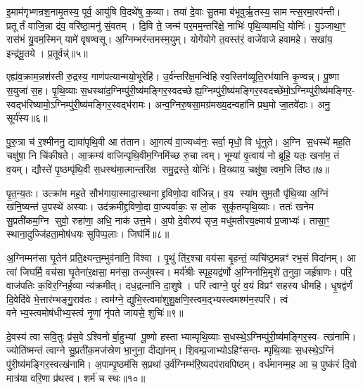 {\anuvakamend[{इद्य॒ज्ञं प्र सु॑व॒ नारि॒रानु॑ष्टुभेन त्वा॒ छन्द॑सा॒ त्रीणि॑ च॥१॥}]}

इ॒माम॑गृभ्णन्रश॒नामृ॒तस्य॒ पूर्व॒ आयु॑षि वि॒दथे॑षु क॒व्या। तया॑ दे॒वाः सु॒तमा ब॑भूवुर्\mbox{}ऋ॒तस्य॒ सामन्त्स॒रमा॒रप॑न्ती। प्रतूर्तं वाजि॒न्ना द्र॑व॒ वरि॑ष्ठा॒मनु॑ सं॒वतम्। दि॒वि ते॒ जन्म॑ पर॒मम॒न्तरि॑क्षे॒ नाभिः॑ पृथि॒व्यामधि॒ योनिः॑। यु॒ञ्जाथा॒ꣳ॒ रास॑भं यु॒वम॒स्मिन् यामे॑ वृषण्वसू। अ॒ग्निम्भर॑न्तमस्म॒युम्। योगे॑योगे त॒वस्त॑रं॒ वाजे॑वाजे हवामहे। सखा॑य॒ इन्द्र॑मू॒तये। प्र॒तूर्वन्न्॑॥५॥

एह्य॑व॒क्राम॒न्नश॑स्ती रु॒द्रस्य॒ गाण॑पत्यान्मयो॒भूरेहि॑। उ॒र्व॑न्तरि॑क्ष॒मन्वि॑हि स्व॒स्तिग॑व्यूति॒रभ॑यानि कृ॒ण्वन्न्। पू॒ष्णा स॒युजा॑ स॒ह। पृ॒थि॒व्याः स॒धस्था॑द॒ग्निम्पु॑री॒ष्य॑मङ्गिर॒स्वदच्छेह्य॒ग्निम्पु॑री॒ष्य॑मङ्गिर॒स्वदच्छे॑मो॒ऽग्निम्पु॑री॒ष्य॑मङ्गिर॒- स्वद्भ॑रिष्यामो॒ऽग्निम्पु॑री॒ष्य॑मङ्गिर॒स्वद्भ॑रामः। अन्व॒ग्निरु॒षसा॒मग्र॑मख्य॒दन्वहा॑नि प्रथ॒मो जा॒तवे॑दाः। अनु॒ सूर्य॑स्य॥६॥

पु॒रु॒त्रा च॑ र॒श्मीननु॒ द्यावा॑पृथि॒वी आ त॑तान। आ॒गत्य॑ वा॒ज्यध्व॑नः॒ सर्वा॒ मृधो॒ वि धू॑नुते। अ॒ग्नि स॒धस्थे॑ मह॒ति चक्षु॑षा॒ नि चि॑कीषते। आ॒क्रम्य॑ वाजिन्पृथि॒वीम॒ग्निमि॑च्छ रु॒चा त्वम्। भूम्या॑ वृ॒त्वाय॑ नो ब्रूहि॒ यतः॒ खना॑म॒ तं व॒यम्। द्यौस्ते॑ पृ॒ष्ठम्पृ॑थि॒वी स॒धस्थ॑मा॒त्मान्तरि॑क्ष समु॒द्रस्ते॒ योनिः॑। वि॒ख्याय॒ चक्षु॑षा॒ त्वम॒भि ति॑ष्ठ॥७॥

पृ॒त॒न्य॒तः। उत्क्रा॑म मह॒ते सौभ॑गाया॒स्मादा॒स्थानाद्द्रविणो॒दा वा॑जिन्न्। व॒य स्या॑म सुम॒तौ पृ॑थि॒व्या अ॒ग्निं ख॑नि॒ष्यन्त॑ उ॒पस्थे॑ अस्याः। उद॑क्रमीद्द्रविणो॒दा वा॒ज्यर्वाकः॒ स लो॒क सुकृ॑तम्पृथि॒व्याः। ततः॑ खनेम सु॒प्रती॑कम॒ग्नि सुवो॒ रुहा॑णा॒ अधि॒ नाक॑ उत्त॒मे। अ॒पो दे॒वीरुप॑ सृज॒ मधु॑मतीरय॒क्ष्माय॑ प्र॒जाभ्यः॑। तासा॒ꣳ॒ स्थाना॒दुज्जि॑हता॒मोष॑धयः सुपिप्प॒लाः। जिघ॑र्मि॥८॥

अ॒ग्निम्मन॑सा घृ॒तेन॑ प्रति॒क्ष्यन्त॒म्भुव॑नानि॒ विश्वा। पृ॒थुं ति॑र॒श्चा वय॑सा बृ॒हन्तं॒ व्यचि॑ष्ठ॒मन्नꣳ॑ रभ॒सं विदा॑नम्। आ त्वा॑ जिघर्मि॒ वच॑सा घृ॒तेना॑र॒क्षसा॒ मन॑सा॒ तज्जु॑षस्व। मर्य॑श्रीः स्पृह॒यद्व॑र्णो अ॒ग्निर्नाभि॒मृशे॑ त॒नुवा॒ जर्\mbox{}हृ॑षाणः। परि॒ वाज॑पतिः क॒विर॒ग्निर्\mbox{}ह॒व्या न्य॑क्रमीत्। दध॒द्रत्ना॑नि दा॒शुषे। परि॑ त्वाग्ने॒ पुरं॑ व॒यं विप्रꣳ॑ सहस्य धीमहि। धृ॒षद्व॑र्णं दि॒वेदि॑वे भे॒त्तार॑म्भङ्गु॒॒राव॑तः। त्वम॑ग्ने॒ द्युभि॒स्त्वमा॑शुशु॒क्षणि॒स्त्वम॒द्भ्यस्त्वमश्म॑न॒स्परि॑। त्वं वनेभ्य॒स्त्वमोष॑धीभ्य॒स्त्वं नृ॒णां नृ॑पते जायसे॒ शुचिः॑॥९॥

{\anuvakamend[{प्र॒तूर्व॒न्थ्सूर्य॑स्य तिष्ठ॒ जिघ॑र्मि भे॒त्तारं॑ विश॒तिश्च॑॥२॥}]}

दे॒वस्य॑ त्वा सवि॒तुः प्र॑स॒वेऽश्विनोर्बा॒हुभ्यां पू॒ष्णो हस्ताभ्याम्पृथि॒व्याः स॒धस्थे॒ऽग्निम्पु॑री॒ष्य॑मङ्गिर॒स्व- त्ख॑नामि। ज्योति॑ष्मन्तं त्वाग्ने सु॒प्रती॑क॒मज॑स्रेण भा॒नुना॒ दीद्या॑नम्। शि॒वम्प्र॒जाभ्योऽहिꣳ॑सन्त- म्पृथि॒व्याः स॒धस्थे॒ऽग्निं पु॑री॒ष्य॑मङ्गिर॒स्वत्ख॑नामि। अ॒पाम्पृ॒ष्ठम॑सि स॒प्रथा॑ उ॒र्व॑ग्निम्भ॑रि॒ष्यदप॑रावपिष्ठम्। वर्ध॑मानम्म॒ह आ च॒ पुष्क॑रं दि॒वो मात्र॑या वरि॒णा प्र॑थस्व। शर्म॑ च स्थः॥१०॥

